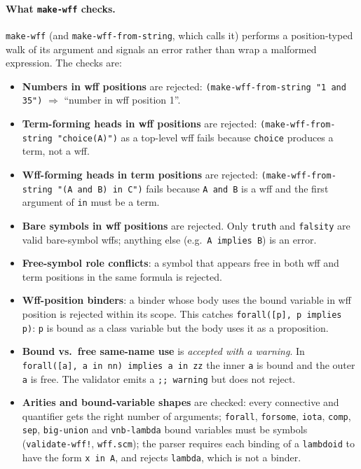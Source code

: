 \paragraph{What \texttt{make-wff} checks.}
\texttt{make-wff} (and \texttt{make-wff-from-string}, which calls it)
performs a position-typed walk of its argument and signals an error
rather than wrap a malformed expression.  The checks are:
\begin{sloppypar}
\begin{itemize}
\item \textbf{Numbers in wff positions} are rejected:
  \texttt{(make-wff-from-string "1 and 35")} $\Rightarrow$ ``number in wff
  position 1''.
\item \textbf{Term-forming heads in wff positions} are rejected:
  \texttt{(make-wff-from-string "choice(A)")} as a top-level wff fails because
  \texttt{choice} produces a term, not a wff.
\item \textbf{Wff-forming heads in term positions} are rejected:
  \texttt{(make-wff-from-string "(A and B) in C")} fails because \texttt{A and B}
  is a wff and the first argument of \texttt{in} must be a term.
\item \textbf{Bare symbols in wff positions} are rejected.  Only
  \texttt{truth} and \texttt{falsity} are valid bare-symbol wffs;
  anything else (e.g.\ \texttt{A implies B}) is an error.
\item \textbf{Free-symbol role conflicts}: a symbol that appears free
  in both wff and term positions in the same formula is rejected.
\item \textbf{Wff-position binders}: a binder whose body uses the
  bound variable in wff position is rejected within its scope.  This
  catches \texttt{forall([p], p implies p)}: \texttt{p} is bound as a
  class variable but the body uses it as a proposition.
\item \textbf{Bound vs.\ free same-name use} is \emph{accepted with a
  warning}.  In \texttt{forall([a], a in nn) implies a in zz} the
  inner \texttt{a} is bound and the outer \texttt{a} is free.  The
  validator emits a \texttt{;; warning} but does not reject.
\item \textbf{Arities and bound-variable shapes} are checked: every
  connective and quantifier gets the right number of arguments;
  \texttt{forall}, \texttt{forsome}, \texttt{iota}, \texttt{comp},
  \texttt{sep}, \texttt{big-union} and \texttt{vnb-lambda} bound variables must be
  symbols (\texttt{validate-wff!}, \texttt{wff.scm}); the parser requires each
  binding of a \texttt{lambdoid} to have the form \texttt{x in A}, and
  rejects \texttt{lambda}, which is not a binder.
\end{itemize}
\end{sloppypar}
